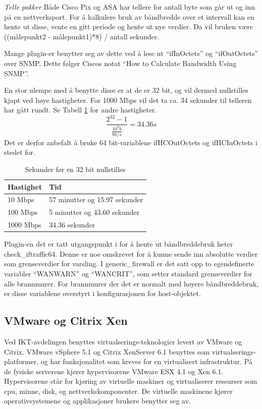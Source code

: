 \textit{Telle pakker}
Både Cisco Pix og ASA har tellere for antall byte som går ut og inn på en nettverksport. For å kalkulere bruk av båndbredde over et intervall kan en hente ut disse, vente en gitt periode og hente ut nye verdier. Da vil bruken være ((målepunkt2 - målepunkt1)*8) / antall sekunder.

Mange plugin-er benytter seg av dette ved å lese ut ``ifInOctets'' og ``ifOutOctets'' over SNMP. Dette følger Ciscos notat ``How to Calculate Bandwidth Using SNMP''\cite{ciscobandwidth}. 

En stor ulempe med å benytte disse er at de er 32 bit, og vil dermed nullstilles kjapt ved høye hastigheter. For 1000 Mbps vil det ta ca. 34 sekunder til telleren har gått rundt. Se Tabell \ref{kalkulering_teller} for andre hastigheter.
\begin{equation}
\frac{2^{32}-1}{\frac{10^9b}{8b/s}}=34.36s
\end{equation}
Det er derfor anbefalt å bruke 64 bit-variablene ifHCOutOctets og ifHCInOctets i stedet for\cite{ciscosnmpcounters}.
\begin{table}
\begin{center}
\begin{tabular}{ | l | p{7cm} |} \hline
    \textbf{Hastighet} & \textbf{Tid} \\ \hline
    10 Mbps & 57 minutter og 15.97 sekunder \\ \hline
    100 Mbps & 5 minutter og 43.60 sekunder \\ \hline
    1000 Mbps & 34.36 sekunder \\ \hline
\end{tabular}
\caption{Sekunder før en 32 bit nullstilles }
\label{kalkulering_teller}
\end{center}
\end{table}
Plugin-en det er tatt utgangspunkt i for å hente ut båndbreddebruk heter check\_iftraffic64\cite{checkciscoif}. Denne er noe omskrevet for å kunne sende inn absolutte verdier som grenseverdier for varsling. I generic\_firewall er det satt opp to egendefinerte variabler ``WANWARN'' og ``WANCRIT'', som setter standard grenseverdier for alle brannmurer. For brannmurer der det er normalt med høyere båndbreddebruk, er disse variablene overstyrt i konfigurasjonen for host-objektet.

\subsection{VMware og Citrix Xen}
Ved IKT-avdelingen benyttes virtualserings-teknologier levert av VMware og Citrix. VMware vSphere 5.1 og Citrix XenServer 6.1 benyttes som virtualserings-platformer, og har funksjonalitet som kreves for en virtualisert infrastruktur. På de fysiske serverene kjører hypervisorene VMware ESX 4.1 og Xen 6.1. Hypervisorene står for kjøring av virtuelle maskiner og virtualiserer ressurser som cpu, minne, disk, og nettverkskomponenter. De virtuelle maskinene kjører operativsystemene og applikasjoner brukere benytter seg av.  

